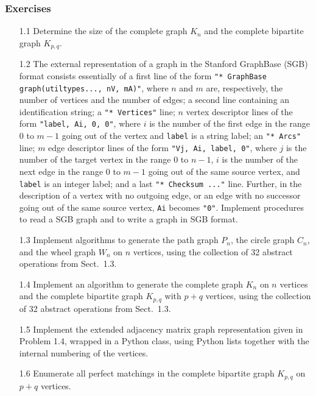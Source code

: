 \documentclass[a4paper,12pt]{article}
\begin{document}
\subsubsection*{Exercises}

\begin{enumerate}
    \item[1.1] Determine the size of the complete graph $K_n$ and the complete bipartite graph $K_{p,q}$.
    
    \item[1.2] The external representation of a graph in the Stanford GraphBase (SGB) format \cite[35]{Val21} consists essentially of a first line of the form \texttt{"* GraphBase graph(utiltypes..., nV, mA)"}, where $n$ and $m$ are, respectively, the number of vertices and the number of edges; a second line containing an identification string; a \texttt{"* Vertices"} line; $n$ vertex descriptor lines of the form \texttt{"label, Ai, 0, 0"}, where $i$ is the number of the first edge in the range $0$ to $m-1$ going out of the vertex and \texttt{label} is a string label; an \texttt{"* Arcs"} line; $m$ edge descriptor lines of the form \texttt{"Vj, Ai, label, 0"}, where $j$ is the number of the target vertex in the range $0$ to $n-1$, $i$ is the number of the next edge in the range $0$ to $m-1$ going out of the same source vertex, and \texttt{label} is an integer label; and a last \texttt{"* Checksum ..."} line. Further, in the description of a vertex with no outgoing edge, or an edge with no successor going out of the same source vertex, \texttt{Ai} becomes \texttt{"0"}. Implement procedures to read a SGB graph and to write a graph in SGB format.

    \item[1.3] Implement algorithms to generate the path graph $P_n$, the circle graph $C_n$, and the wheel graph $W_n$ on $n$ vertices, using the collection of 32 abstract operations from Sect.~1.3.
    
    \item[1.4] Implement an algorithm to generate the complete graph $K_n$ on $n$ vertices and the complete bipartite graph $K_{p,q}$ with $p + q$ vertices, using the collection of 32 abstract operations from Sect.~1.3.

    \item[1.5] Implement the extended adjacency matrix graph representation given in Problem 1.4, wrapped in a Python class, using Python lists together with the internal numbering of the vertices.
    
    \item[1.6] Enumerate all perfect matchings in the complete bipartite graph $K_{p,q}$ on $p + q$ vertices.
    

\end{enumerate}
\end{document}
